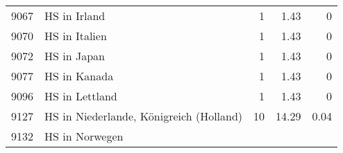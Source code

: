 \begin{longtable}{lXrrr}
     9067 &
     \multicolumn{1}{X}{ HS in Irland   } &


       \num{1} &
       \num[round-mode=places,round-precision=2]{1.43} &
         \num[round-mode=places,round-precision=2]{0} \\

     9070 &
     \multicolumn{1}{X}{ HS in Italien   } &


       \num{1} &
       \num[round-mode=places,round-precision=2]{1.43} &
         \num[round-mode=places,round-precision=2]{0} \\

     9072 &
     \multicolumn{1}{X}{ HS in Japan   } &


       \num{1} &
       \num[round-mode=places,round-precision=2]{1.43} &
         \num[round-mode=places,round-precision=2]{0} \\

     9077 &
     \multicolumn{1}{X}{ HS in Kanada   } &


       \num{1} &
       \num[round-mode=places,round-precision=2]{1.43} &
         \num[round-mode=places,round-precision=2]{0} \\

     9096 &
     \multicolumn{1}{X}{ HS in Lettland   } &


       \num{1} &
       \num[round-mode=places,round-precision=2]{1.43} &
         \num[round-mode=places,round-precision=2]{0} \\

     9127 &
     \multicolumn{1}{X}{ HS in Niederlande, Königreich (Holland)   } &


       \num{10} &
       \num[round-mode=places,round-precision=2]{14.29} &
         \num[round-mode=places,round-precision=2]{0.04} \\

     9132 &
     \multicolumn{1}{X}{ HS in Norwegen   } &



\end{longtable}
